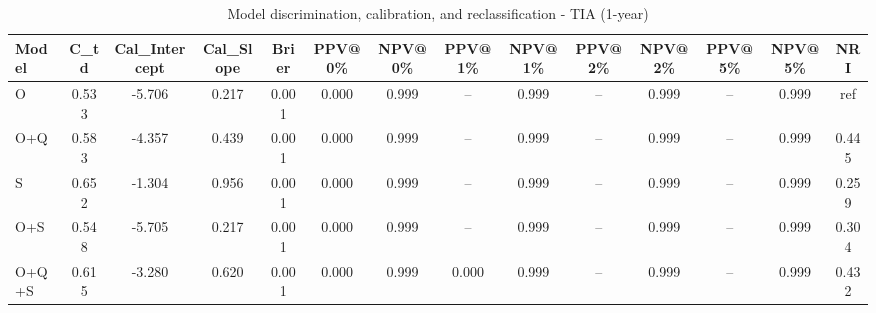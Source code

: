 \begin{table}[htbp]
\centering
\small
\caption{Model discrimination, calibration, and reclassification - TIA (1-year)}
\label{tab:perf_tia_1y}
\begin{tabular}{lccccccccccccc}
\toprule
Model & C\_td & Cal\_Intercept & Cal\_Slope & Brier & PPV@0\% & NPV@0\% & PPV@1\% & NPV@1\% & PPV@2\% & NPV@2\% & PPV@5\% & NPV@5\% & NRI \\
\midrule
O & 0.533 & -5.706 & 0.217 & 0.001 & 0.000 & 0.999 & -- & 0.999 & -- & 0.999 & -- & 0.999 & ref \\
O+Q & 0.583 & -4.357 & 0.439 & 0.001 & 0.000 & 0.999 & -- & 0.999 & -- & 0.999 & -- & 0.999 & 0.445 \\
S & 0.652 & -1.304 & 0.956 & 0.001 & 0.000 & 0.999 & -- & 0.999 & -- & 0.999 & -- & 0.999 & 0.259 \\
O+S & 0.548 & -5.705 & 0.217 & 0.001 & 0.000 & 0.999 & -- & 0.999 & -- & 0.999 & -- & 0.999 & 0.304 \\
O+Q+S & 0.615 & -3.280 & 0.620 & 0.001 & 0.000 & 0.999 & 0.000 & 0.999 & -- & 0.999 & -- & 0.999 & 0.432 \\
\bottomrule
\end{tabular}
\end{table}